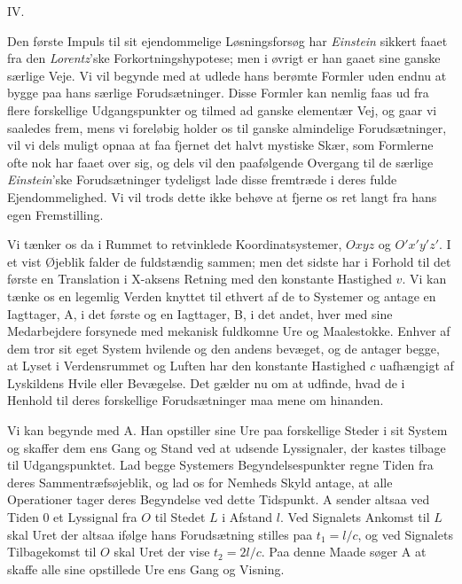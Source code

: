 \documentclass[12pt,a4paper]{article}
\newcommand{\opage}[1]{\marginnote{\footnotesize\textit{[#1]}}}
\begin{document}
\begin{center}
IV.
\end{center}

Den første Impuls til sit ejendommelige Løsningsforsøg har \emph{Einstein}
sikkert faaet fra den \emph{Lorentz}'ske Forkortningshypotese; men i øvrigt er
han gaaet sine ganske særlige Veje. Vi vil begynde med at udlede hans berømte
Formler uden endnu at bygge paa hans særlige Forudsætninger. Disse Formler kan
nemlig faas ud fra flere forskellige Udgangspunkter og tilmed ad ganske
elementær Vej, og gaar vi saaledes frem, mens vi foreløbig holder os til
ganske almindelige Forudsætninger, vil vi dels muligt opnaa at faa fjernet det
halvt mystiske Skær, som Formlerne ofte nok har faaet over sig, og dels vil
den paafølgende Overgang til de særlige \emph{Einstein}'ske Forudsætninger
tydeligst lade disse fremtræde i deres fulde Ejendommelighed. Vi vil trods
dette ikke behøve at fjerne os ret langt fra hans egen Fremstilling.

Vi tænker os da i Rummet to retvinklede Koordinatsystemer, $Oxyz$ og
$O'x'y'z'$. I et vist Øjeblik falder de fuldstændig sammen; men det sidste har
i Forhold til det første en Translation i X-aksens Retning med den konstante
Hastighed $v$. Vi kan tænke os en legemlig Verden knyttet til ethvert af de to
Systemer og antage en Iagttager, A, i det første og en Iagttager, B, i det
andet, hver med sine Medarbejdere forsynede med mekanisk fuldkomne Ure og
Maalestokke. Enhver af dem tror sit eget System hvilende og den andens
bevæget, og de antager begge, at Lyset i Verdensrummet og Luften har den
konstante Hastighed $c$ uafhængigt af Lyskildens Hvile eller Bevægelse. Det
gælder nu om at udfinde, hvad de i Henhold til deres forskellige
Forudsætninger maa mene om hinanden.

Vi kan begynde med A. Han opstiller sine Ure paa forskellige Steder i sit
System og skaffer dem ens Gang og Stand ved at udsende Lyssignaler, der kastes
tilbage til Udgangspunktet. Lad begge Systemers Begyndelsespunkter regne Tiden
fra deres Sammentræfsøjeblik, og lad os for Nemheds Skyld antage, at alle
Operationer tager
\opage{10} deres Begyndelse ved dette Tidspunkt. A sender altsaa ved Tiden 0 et Lyssignal
fra $O$ til Stedet $L$ i Afstand $l$. Ved Signalets Ankomst til $L$ skal Uret
der altsaa ifølge hans Forudsætning stilles paa $t_{1} = l/c$, og ved
Signalets Tilbagekomst til $O$ skal Uret der vise $t_{2} = 2l/c$. Paa denne
Maade søger A at skaffe alle sine opstillede Ure ens Gang og Visning.
\end{document}

